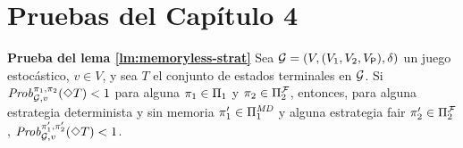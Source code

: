 \section{Pruebas del Capítulo 4}


\noindent
\textbf{Prueba del lema \ref{lm:memoryless-strat}}
  Sea $\mathcal{G} = (V, (V_1, V_2, V_{\mathsf{P}}), \delta)$ un juego estocástico, $v \in V$, y sea $T$ el conjunto de estados terminales en $\mathcal{G}$.
  Si $\mathit{Prob}^{\pi_{1}, \pi_{2}}_{\mathcal{G}, v}(\Diamond T) < 1$
  para alguna
  $\pi_{1} \in \Pi_{1}$ y $\pi_{2} \in \Pi^{\mathcal{F}}_{2}$,
  entonces, para alguna estrategia determinista y sin memoria
  $\pi_{1}' \in \Pi^{\textit{MD}}_{1}$ y alguna estrategia fair
  $\pi_{2}' \in \Pi^{\mathcal{F}}_{2}$,
  $\mathit{Prob}^{\pi_{1}', \pi_{2}'}_{\mathcal{G}, v}(\Diamond T) < 1$.
\noindent \\

